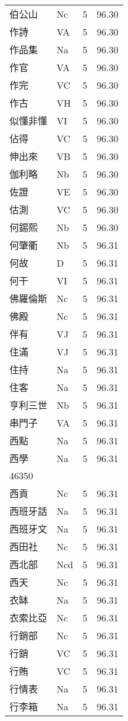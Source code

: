 \documentclass[twocolumn]{book}
\begin{document}
\begin{supertabular}{llrr}
伯公山 & Nc & 5 &  96.30\\
作詩 & VA & 5 &  96.30\\
作品集 & Na & 5 &  96.30\\
作官 & VA & 5 &  96.30\\
作完 & VC & 5 &  96.30\\
作古 & VH & 5 &  96.30\\
似懂非懂 & VI & 5 &  96.30\\
佔得 & VC & 5 &  96.30\\
伸出來 & VB & 5 &  96.30\\
伽利略 & Nb & 5 &  96.30\\
佐證 & VE & 5 &  96.30\\
估測 & VC & 5 &  96.30\\
何錫熙 & Nb & 5 &  96.30\\
何肇衢 & Nb & 5 &  96.31\\
何故 & D & 5 &  96.31\\
何干 & VI & 5 &  96.31\\
佛羅倫斯 & Nc & 5 &  96.31\\
佛殿 & Nc & 5 &  96.31\\
伴有 & VJ & 5 &  96.31\\
住滿 & VJ & 5 &  96.31\\
住持 & Na & 5 &  96.31\\
住客 & Na & 5 &  96.31\\
亨利三世 & Nb & 5 &  96.31\\
串門子 & VA & 5 &  96.31\\
西點 & Na & 5 &  96.31\\
西學 & Na & 5 &  96.31\\
46350\\
西貢 & Nc & 5 &  96.31\\
西班牙話 & Na & 5 &  96.31\\
西班牙文 & Na & 5 &  96.31\\
西田社 & Nc & 5 &  96.31\\
西北部 & Ncd & 5 &  96.31\\
西天 & Nc & 5 &  96.31\\
衣缽 & Na & 5 &  96.31\\
衣索比亞 & Nc & 5 &  96.31\\
行銷部 & Nc & 5 &  96.31\\
行銷 & VC & 5 &  96.31\\
行賄 & VC & 5 &  96.31\\
行情表 & Na & 5 &  96.31\\
行李箱 & Na & 5 &  96.31\\

\end{supertabular}
\end{document}

